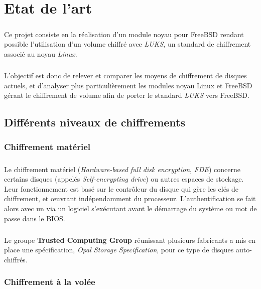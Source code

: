\chapter{Etat de l'art}

\paragraph{}
Ce projet consiste en la réalisation d'un module noyau pour FreeBSD rendant
possible l'utilisation d'un volume chiffré avec
\textit{LUKS}\cite{onDiskFormatLuks}, un standard de chiffrement associé au
noyau \textit{Linux}.
\paragraph{}
L'objectif est donc de relever et comparer les moyens de chiffrement de disques
actuels, et d'analyser plus particulièrement les modules noyau Linux et FreeBSD
gérant le chiffrement de volume afin de porter le standard
\textit{LUKS}\cite{onDiskFormatLuks} vers FreeBSD.

\section{Différents niveaux de chiffrements}

\subsection{Chiffrement matériel}
\paragraph{}
Le chiffrement matériel (\textit{Hardware-based full disk encryption},
\textit{FDE}) concerne certains disques (appelés \textit{Self-encrypting drive})
ou autres espaces de stockage. Leur fonctionnement est basé sur le contrôleur
du disque qui gère les clés de chiffrement, et œuvrant indépendamment du 
processeur. L'authentification se fait alors avec un via un logiciel 
s'exécutant avant le démarrage du système ou mot de passe dans le BIOS.
\paragraph{}
Le groupe \textbf{Trusted Computing Group} réunissant plusieurs fabricants a mis
en place une spécification, \textit{Opal Storage Specification}, pour ce type de
disques auto-chiffrés.

\subsection{Chiffrement à la volée}
